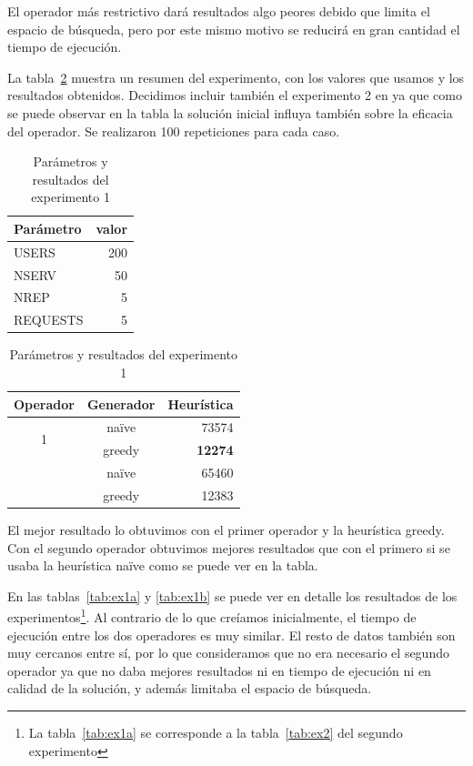 \begin{hyp*}
El operador más restrictivo dará resultados algo peores debido que limita el espacio de búsqueda, pero por este mismo motivo se reducirá en gran cantidad el tiempo de ejecución.
\end{hyp*}

La tabla~\ref{tab:ex1} muestra un resumen del experimento, con los valores que usamos y los resultados obtenidos.
Decidimos incluir también el experimento 2 en ya que como se puede observar en la tabla la solución inicial
influya también sobre la eficacia del operador. Se realizaron 100 repeticiones para cada caso.

\begin{table}[H]
    \caption{Parámetros y resultados del experimento 1}%
    \label{tab:ex1}
    \vspace{-1em}
    \begin{center}
    \begin{tabular}{lr}
    \toprule
    Parámetro & valor \\
    \midrule
    USERS & 200 \\
    NSERV & 50 \\
    NREP & 5 \\
    REQUESTS & 5\\
    \bottomrule
    \end{tabular}
    \hspace{2em}
    \begin{tabular}{ccr}
    \toprule
    Operador & Generador & Heurística \\
    \midrule
    \multirow{2}{*}{1} & naïve &  73574\\
    {} & greedy & \textbf{12274} \\
    \addlinespace[0.5em]
    \multirow{2}{*}{2} & naïve &  65460\\
    {} & greedy & 12383 \\
    \bottomrule
    \end{tabular}
    \end{center}
\end{table}
\vspace{-2em}

El mejor resultado lo obtuvimos con el primer operador y la heurística greedy. Con el segundo operador
obtuvimos mejores resultados que con el primero si se usaba la heurística naïve como se puede ver en la
tabla.

En las tablas~\ref{tab:ex1a} y \ref{tab:ex1b} se puede ver en detalle los resultados de los experimentos\footnote{La tabla~\ref{tab:ex1a} se corresponde a la tabla~\ref{tab:ex2} del segundo experimento}. Al contrario
de lo que creíamos inicialmente, el tiempo de ejecución entre los dos operadores es muy similar. El resto
de datos también son muy cercanos entre sí, por lo que consideramos que no era necesario el segundo operador
ya que no daba mejores resultados ni en tiempo de ejecución ni en calidad de la solución, y además limitaba
el espacio de búsqueda.

